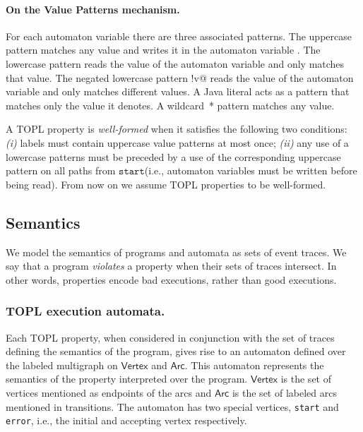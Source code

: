 \documentclass{sigplanconf}[10pt] %
\newcommand{\set}[1]{\ensuremath{\mathsf{#1}}}
\newcommand{\start}{\ensuremath{\mathtt{start}}\xspace}
\begin{document}
\paragraph{On the Value Patterns mechanism.}
For each automaton variable \Verb@v@ there are three associated patterns.
The uppercase pattern \Verb@V@ matches any value and writes it in the automaton variable \Verb@v@.
The lowercase pattern \Verb@v@ reads the value of the automaton variable \Verb@v@ and only matches that value.
The negated lowercase pattern \Verb@!v@ reads the value of the automaton variable \Verb@v@ and only matches different values.
A Java literal acts as a pattern that matches only the value it denotes.
A wildcard~* pattern matches any value.

\smallskip
A TOPL property is \emph{well-formed} when it satisfies the following two conditions:
{\em (i)} labels must contain uppercase value patterns at most once; {\em (ii)}
any use of a lowercase patterns must be preceded by a use of the corresponding uppercase pattern on all paths from \start  (i.e., automaton variables must be written before being read).
From now on we assume TOPL properties to be well-formed.

\subsection{Semantics}\label{sec:semantics} %
We model the semantics of programs and automata as sets of event traces.
We say that a program \emph{violates} a property when their sets of traces intersect.
In other words, properties encode bad executions, rather than good executions.

\subsubsection{TOPL execution automata.}
\newcommand{\World}{ExecState}

Each TOPL property, when considered in conjunction with the set of traces defining the semantics of the program, gives rise to an automaton defined over the labeled multigraph  on $\set{Vertex}$ and $\set{Arc}$.
This automaton represents the semantics of the property interpreted over the program.
$\set{Vertex}$ is the set of vertices mentioned as endpoints of the arcs and $\set{Arc}$ is the set of labeled arcs mentioned in transitions.
The automaton has two special vertices, {\tt start} and {\tt error},  i.e., the initial and accepting vertex respectively.
\end{document}
